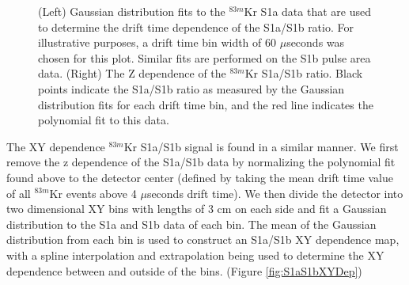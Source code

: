 \documentclass[a4paper,12pt]{article}
\begin{document}
{\begin{figure} [h!]
\centering
{}
\qquad
{}
\caption{ (Left) Gaussian distribution fits to the $^{83m}$Kr S1a data that are used to determine the drift time dependence of the S1a/S1b ratio. For illustrative purposes, a drift time bin width of 60 $\mu$seconds was chosen for this plot.  Similar fits are performed on the S1b pulse area data. (Right) The Z dependence of the $^{83m}$Kr S1a/S1b ratio.  Black points indicate the S1a/S1b ratio as measured by the Gaussian distribution fits for each drift time bin, and the red line indicates the polynomial fit to this data.}
\label{fig:S1aGaussianPlot}
\end{figure}

The XY dependence $^{83m}$Kr S1a/S1b signal is found in a similar manner.  We first remove the z dependence of the S1a/S1b data by normalizing the polynomial fit found above to the detector center (defined by taking the mean drift time value of all $^{83m}$Kr events above 4 $\mu$seconds drift time). We then divide the detector into two dimensional XY bins with lengths of 3 cm on each side and fit a Gaussian distribution to the S1a and S1b data of each bin.  The mean of the Gaussian distribution from each bin is used to construct an S1a/S1b XY dependence map, with a spline interpolation and extrapolation being used to determine the XY dependence between and outside of the bins. (Figure \ref{fig:S1aS1bXYDep})

}
\end{document}
